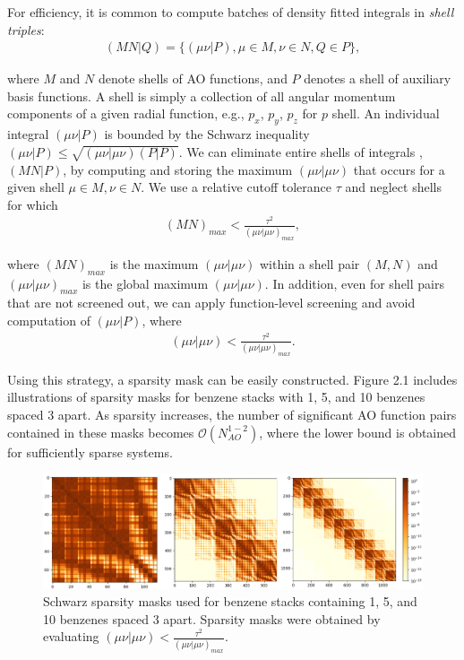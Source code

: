 For efficiency, it is common to compute batches of density fitted integrals in \textit{shell triples}: 
\begin{align} 
(M N | Q) = \{(\mu \nu|P), \mu \in M, \nu \in N, Q \in P\}, 
\end{align} 

\noindent where $M$ and $N$ denote shells of AO functions, and $P$ denotes a shell of auxiliary basis functions. 
A shell is simply a collection of all angular momentum components of a given radial function, e.g., $p_x$, $p_y$, $p_z$ for $p$ shell. 
An individual integral $(\mu \nu | P)$ is bounded by the Schwarz inequality $(\mu \nu | P) \leq 
\sqrt{(\mu \nu | \mu \nu)(P|P)}$. We can eliminate entire shells of integrals , $(MN|P)$, by computing
and storing the maximum $(\mu \nu | \mu \nu)$ that occurs for a given shell $\mu \in M, \nu \in N$. We use a relative cutoff tolerance
$\tau$ and neglect shells for which 
\begin{align}
(MN)_{max} < \frac{\tau^2}{(\mu \nu | \mu \nu)_{max}},
\end{align}

\noindent where $(MN)_{max}$ is the maximum $(\mu \nu | \mu \nu)$
within a shell pair $(M, N)$ and $(\mu \nu | \mu \nu)_{max}$ is the global maximum $(\mu \nu | \mu \nu)$. In addition, even for shell pairs
that are not screened out, we can apply function-level screening and avoid computation of $(\mu \nu | P)$, where
\begin{align}
(\mu \nu | \mu \nu) < \frac{\tau^2}{(\mu \nu | \mu \nu)_{max}}.
\end{align}

Using this strategy, a sparsity mask can be easily constructed. Figure 2.1 includes
illustrations of sparsity masks for benzene stacks with 1, 5, and 10 benzenes spaced 3\text{\AA} apart. As sparsity increases, the number of
significant AO function pairs contained in these masks becomes $\mathcal{O}(N_{AO}^{1-2})$, where the lower bound is obtained for 
sufficiently sparse systems. 

\begin{figure}[H] 
\centering
\includegraphics[scale=0.2]{figures/sparsity_plots/sparsity_masks.png} \caption{Schwarz sparsity masks used for benzene stacks containing 
1, 5, and 10 benzenes spaced 3\text{\AA}  apart. Sparsity masks were obtained by evaluating $(\mu\nu|\mu\nu)<\frac{\tau^2}{(\mu\nu|\mu\nu)_{max}}$.}
\label{fig:databases} \end{figure}


